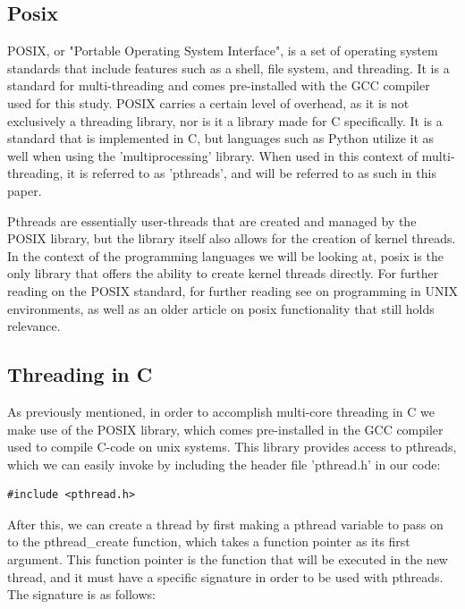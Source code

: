 \documentclass[12pt,a4paper]{article}
\begin{document}
\subsection{Posix}

POSIX, or "Portable Operating System Interface"\parencite{GNUPOSIX,POSIXDocs}, is a set of operating system standards that include features such as a shell, file system, and threading. It is a standard for multi-threading and comes pre-installed with the GCC compiler\parencite{GNUPOSIX} used for this study. POSIX carries a certain level of overhead, as it is not exclusively a threading library, nor is it a library made for C specifically. It is a standard that is implemented in C, but languages such as Python utilize it as well when using the 'multiprocessing' library. When used in this context of multi-threading, it is referred to as 'pthreads', and will be referred to as such in this paper.

Pthreads are essentially user-threads that are created and managed by the POSIX library, but the library itself also allows for the creation of kernel threads. In the context of the programming languages we will be looking at, posix is the only library that offers the ability to create kernel threads directly. For further reading on the POSIX standard, for further reading see  on programming in UNIX environments, as well as  an older article on posix functionality that still holds relevance.

\subsection{Threading in C}

As previously mentioned, in order to accomplish multi-core threading in C we make use of the POSIX library, which comes pre-installed in the GCC compiler used to compile C-code on unix systems. This library provides access to pthreads, which we can easily invoke by including the header file 'pthread.h' in our code:

\begin{verbatim}
#include <pthread.h>
\end{verbatim}

After this, we can create a thread by first making a pthread variable to pass on to the pthread\_create function, which takes a function pointer as its first argument. This function pointer is the function that will be executed in the new thread, and it must have a specific signature in order to be used with pthreads. The signature is as follows:
\end{document}
